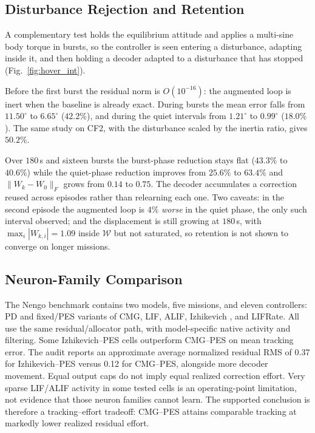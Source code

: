 \documentclass[letterpaper,10pt,conference]{IEEEtran}
\begin{document}
\subsection{Disturbance Rejection and Retention}
\label{sec:disturbance}
A complementary test holds the equilibrium attitude and applies a
multi-sine body torque in bursts, so the controller is seen entering a
disturbance, adapting inside it, and then holding a decoder adapted to a
disturbance that has stopped (Fig.~\ref{fig:hover_int}).

Before the first burst the residual norm is $O(10^{-16})$: the augmented
loop is inert when the baseline is already exact. During bursts the mean
error falls from $11.50^\circ$ to $6.65^\circ$ ($42.2\%$), and during the
quiet intervals from $1.21^\circ$ to $0.99^\circ$ ($18.0\%$). The same study
on CF2, with the disturbance scaled by the inertia ratio, gives $50.2\%$.

Over $180$\,s and sixteen bursts the burst-phase reduction stays flat
($43.3\%$ to $40.6\%$) while the quiet-phase reduction improves from
$25.6\%$ to $63.4\%$ and $\|W_k-W_0\|_F$ grows from $0.14$ to $0.75$. The
decoder accumulates a correction reused across episodes rather than
relearning each one. Two caveats: in the second episode the augmented loop
is $4\%$ \emph{worse} in the quiet phase, the only such interval observed;
and the displacement is still growing at $180$\,s, with
$\max_i|W_{k,i}|=1.09$ inside $\mathcal W$ but not saturated, so retention is
not shown to converge on longer missions.

\subsection{Neuron-Family Comparison}
The Nengo benchmark contains two models, five missions, and eleven
controllers: PD and fixed/PES variants of CMG, LIF, ALIF, Izhikevich
\cite{izhikevich2003}, and LIFRate. All use the same residual/allocator
path, with model-specific native activity and filtering. Some
Izhikevich--PES cells outperform CMG--PES on mean tracking error. The audit
reports an approximate average normalized residual RMS of 0.37 for
Izhikevich--PES versus 0.12 for CMG--PES, alongside more decoder movement.
Equal output caps do not imply equal realized correction effort.
Very sparse LIF/ALIF activity in some tested cells is an operating-point
limitation, not evidence that those neuron families cannot learn.
The supported conclusion is therefore a tracking--effort tradeoff: CMG--PES
attains comparable tracking at markedly lower realized residual effort.
\end{document}
